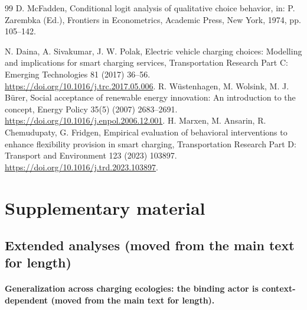 \documentclass[12pt]{article}
\begin{document}
\begin{thebibliography}{99}
 D. McFadden, Conditional logit analysis of qualitative choice behavior, in: P. Zarembka (Ed.), Frontiers in Econometrics, Academic Press, New York, 1974, pp. 105--142.

 N. Daina, A. Sivakumar, J. W. Polak, Electric vehicle charging choices: Modelling and implications for smart charging services, Transportation Research Part C: Emerging Technologies 81 (2017) 36--56. \url{https://doi.org/10.1016/j.trc.2017.05.006}.
 R. W\"ustenhagen, M. Wolsink, M. J. B\"urer, Social acceptance of renewable energy innovation: An introduction to the concept, Energy Policy 35(5) (2007) 2683--2691. \url{https://doi.org/10.1016/j.enpol.2006.12.001}.
 H. Marxen, M. Ansarin, R. Chemudupaty, G. Fridgen, Empirical evaluation of behavioral interventions to enhance flexibility provision in smart charging, Transportation Research Part D: Transport and Environment 123 (2023) 103897. \url{https://doi.org/10.1016/j.trd.2023.103897}.

\end{thebibliography}

\clearpage
\section*{Supplementary material}\label{sec:supp}

\renewcommand{\thefigure}{S\arabic{figure}}
\setcounter{figure}{0}
\renewcommand{\thetable}{S\arabic{table}}
\setcounter{table}{0}

\subsection*{Extended analyses (moved from the main text for length)}

\paragraph{Generalization across charging ecologies: the binding actor is context-dependent (moved from the main text for length).}
\end{document}
